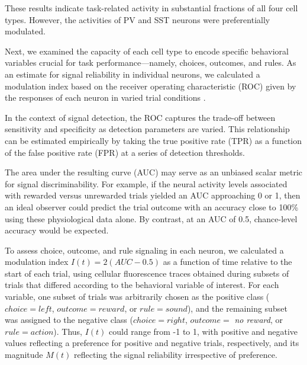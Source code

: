 These results indicate task-related activity in substantial fractions of all four cell types. However, the activities of PV and SST neurons were preferentially modulated.


Next, we examined the capacity of each cell type to encode specific behavioral variables crucial for task performance---namely, choices, outcomes, and rules. As an estimate for signal reliability in individual neurons, we calculated a modulation index based on the receiver operating characteristic (ROC) given by the responses of each neuron in varied trial conditions \citep{barlow1971responses,feierstein2006representation}. 

In the context of signal detection, the ROC captures the trade-off between sensitivity and specificity as detection parameters are varied. This relationship can be estimated empirically by taking the true positive rate (TPR) as a function of the false positive rate (FPR) at a series of detection thresholds. 

The area under the resulting curve (AUC) may serve as an unbiased scalar metric for signal discriminability. For example, if the neural activity levels associated with rewarded versus unrewarded trials yielded an AUC approaching 0 or 1, then an ideal observer could predict the trial outcome with an accuracy close to 100\% using these physiological data alone. By contrast, at an AUC of 0.5, chance-level accuracy would be expected. 

To assess choice, outcome, and rule signaling in each neuron, we calculated a modulation index $I(t) = 2(\mathit{AUC} - 0.5)$ as a function of time relative to the start of each trial, using cellular fluorescence traces obtained during subsets of trials that differed according to the behavioral variable of interest. For each variable, one subset of trials was arbitrarily chosen as the positive class ($\mathit{choice}=\mathit{left}$, $\mathit{outcome}=\mathit{reward}$, or $\mathit{rule}=\mathit{sound}$), and the remaining subset was assigned to the negative class ($\mathit{choice}=\mathit{right}$, $\mathit{outcome}=$ \emph{no reward}, or $\mathit{rule}=\mathit{action}$). Thus, $I(t)$ could range from -1 to 1, with positive and negative values reflecting a preference for positive and negative trials, respectively, and its magnitude $M(t)$ reflecting the signal reliability irrespective of preference.



